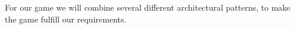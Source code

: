 For our game we will combine several different architectural patterns, to make the game fulfill our requirements.



